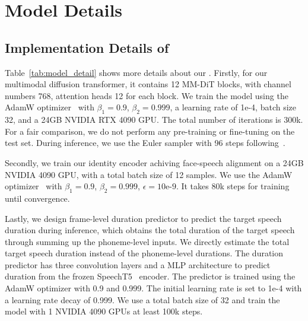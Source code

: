 \section{Model Details}
\label{sec:model}
\subsection{Implementation Details of \methodname}
\label{sec:our_model}
Table~\ref{tab:model_detail} shows more details about our \methodname. 
Firstly, for our multimodal diffusion transformer, it contains 12 MM-DiT blocks, with channel numbers 768, attention heads 12 for each block. We train the model using the AdamW optimizer~\cite{adamw/LoshchilovH19} with $\beta_1=0.9$, $\beta_2=0.999$, a learning rate of 1e-4, batch size 32, and a 24GB NVIDIA RTX 4090 GPU. The total number of iterations is 300k. For a fair comparison, we do not perform any pre-training or fine-tuning on the test set. During inference, we use the Euler sampler with 96 steps following~\cite{SEDD:conf/icml/LouME24}. 

Secondly, we train our identity encoder achiving face-speech alignment on a 24GB NVIDIA 4090 GPU, with a total batch size of 12 samples. We use the AdamW optimizer~\cite{adamw/LoshchilovH19} with $\beta_1=0.9$, $\beta_2=0.999$, $\epsilon=10\text{e-9}$. It takes 80k steps for training until convergence.

Lastly, we design frame-level duration predictor to predict the target speech duration during inference, which obtains the total duration of the target speech through summing up the phoneme-level inputs. We directly estimate the total target speech duration instead of the phoneme-level durations. The duration predictor has three convolution layers and a MLP architecture to predict duration from the frozen SpeechT5~\cite{speecht5:conf/acl/AoWZ0RW0KLZWQ0W22} encoder. 
The predictor is trained using the AdamW optimizer with 0.9 and 0.999. The initial learning rate is set to 1e-4 with a learning rate decay of 0.999. We use a total batch size of 32 and train the model with 1 NVIDIA 4090 GPUs at least 100k steps. 


